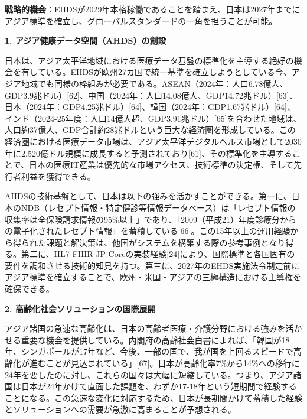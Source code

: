 \documentclass[
  a4paper,
  a4paper,
  11pt]{ltjsbook}
\begin{document}
\begin{tcolorbox}[enhanced jigsaw, toprule=.15mm, bottomtitle=1mm, coltitle=black, left=2mm, opacityback=0, arc=.35mm, colbacktitle=quarto-callout-tip-color!10!white, colback=white, opacitybacktitle=0.6, bottomrule=.15mm, rightrule=.15mm, breakable, title=\textcolor{quarto-callout-tip-color}{\faLightbulb}\hspace{0.5em}{Tip}, toptitle=1mm, titlerule=0mm, colframe=quarto-callout-tip-color-frame, leftrule=.75mm]

\textbf{戦略的機会}：EHDSが2029年本格稼働であることを踏まえ、日本は2027年までにアジア標準を確立し、グローバルスタンダードの一角を担うことが可能。

\end{tcolorbox}

\textbf{1. アジア健康データ空間（AHDS）の創設}

日本は、アジア太平洋地域における医療データ基盤の標準化を主導する絶好の機会を有している。EHDSが欧州27カ国で統一基準を確立しようとしている今、アジア地域でも同様の枠組みが必要である。ASEAN（2024年：人口6.78億人、GDP3.9兆ドル）{[}62{]}、中国（2024年：人口14.08億人、GDP14.72兆ドル）{[}63{]}、日本（2024年：GDP4.25兆ドル）{[}64{]}、韓国（2024年：GDP1.67兆ドル）{[}64{]}、インド（2024-25年度：人口14億人超、GDP3.91兆ドル）{[}65{]}を合わせた地域は、人口約37億人、GDP合計約28兆ドルという巨大な経済圏を形成している。この経済圏における医療データ市場は、アジア太平洋デジタルヘルス市場として2030年に2,520億ドル規模に成長すると予測されており{[}61{]}、その標準化を主導することで、日本の医療IT産業は優先的な市場アクセス、技術標準の決定権、そして先行者利益を獲得できる。

AHDSの技術基盤として、日本は以下の強みを活かすことができる。第一に、日本のNDB（レセプト情報・特定健診等情報データベース）は「レセプト情報の収集率は全保険請求情報の95\%以上」であり、「2009（平成21）年度診療分からの電子化されたレセプト情報」を蓄積している{[}66{]}。この15年以上の運用経験から得られた課題と解決策は、他国がシステムを構築する際の参考事例となり得る。第二に、HL7
FHIR JP
Coreの実装経験{[}24{]}により、国際標準と各国固有の要件を調和させる技術的知見を持つ。第三に、2027年のEHDS実施法令制定前にアジア標準を確立することで、欧州・米国・アジアの三極構造における主導権を確保できる。

\textbf{2. 高齢化社会ソリューションの国際展開}

アジア諸国の急速な高齢化は、日本の高齢者医療・介護分野における強みを活かせる重要な機会を提供している。内閣府の高齢社会白書によれば、「韓国が18年、シンガポールが17年など、今後、一部の国で、我が国を上回るスピードで高齢化が進むことが見込まれている」{[}67{]}。日本が高齢化率7\%から14\%への移行に24年を要したのに対し、これらの国々は大幅に短縮している。つまり、アジア諸国は日本が24年かけて直面した課題を、わずか17-18年という短期間で経験することになる。この急速な変化に対応するため、日本が長期間かけて蓄積した経験とソリューションへの需要が急激に高まることが予想される。
\end{document}
